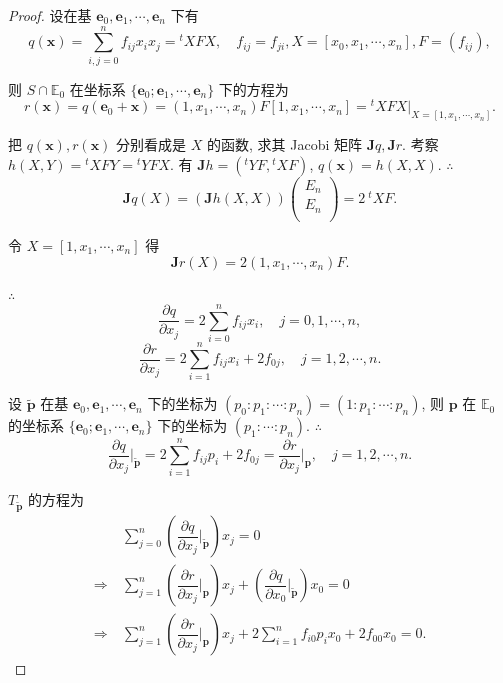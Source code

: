 \documentclass{ctexart}
\begin{document}
\begin{proof}
    设在基 $\boldsymbol{e}_0,\boldsymbol{e}_1,\cdots,\boldsymbol{e}_n$ 下有
    \[q(\boldsymbol{x})=\sum\limits_{i,j=0}^nf_{ij}x_ix_j={}^tXFX,\quad f_{ij}=f_{ji},X=[x_0,x_1,\cdots,x_n],F=(f_{ij}),\]

    则 $S\cap\mathbb{E}_0$ 在坐标系 $\{\boldsymbol{e}_0;\boldsymbol{e}_1,\cdots,\boldsymbol{e}_n\}$ 下的方程为
    \[r(\boldsymbol{x})=q(\boldsymbol{e}_0+\boldsymbol{x})=(1,x_1,\cdots,x_n)F[1,x_1,\cdots,x_n]={}^tXFX\Big|_{X=[1,x_1,\cdots,x_n]}.\]

    把 $q(\boldsymbol{x}),r(\boldsymbol{x})$ 分别看成是 $X$ 的函数, 求其 Jacobi 矩阵 $\boldsymbol{J}q,\boldsymbol{J}r$. 考察 $h(X,Y)={}^tXFY={}^tYFX$. 有 $\boldsymbol{J}h=({}^tYF,{}^tXF)$, $q(\boldsymbol{x})=h(X,X)$. $\therefore$
    \[\boldsymbol{J}q(X)=(\boldsymbol{J}h(X,X))\begin{pmatrix}
        E_n \\
        E_n \\
    \end{pmatrix}=2\ {}^tXF.\]

    令 $X=[1,x_1,\cdots,x_n]$ 得
    \[\boldsymbol{J}r(X)=2(1,x_1,\cdots,x_n)F.\]

    $\therefore$
    \[\dfrac{\partial q}{\partial x_j}=2\sum\limits_{i=0}^nf_{ij}x_i,\quad j=0,1,\cdots,n,\]
    \[\dfrac{\partial r}{\partial x_j}=2\sum\limits_{i=1}^nf_{ij}x_i+2f_{0j},\quad j=1,2,\cdots,n.\]

    设 $\tilde{\boldsymbol{p}}$ 在基 $\boldsymbol{e}_0,\boldsymbol{e}_1,\cdots,\boldsymbol{e}_n$ 下的坐标为 $(p_0:p_1:\cdots:p_n)=(1:p_1:\cdots:p_n)$, 则 $\boldsymbol{p}$ 在 $\mathbb{E}_0$ 的坐标系 $\{\boldsymbol{e}_0;\boldsymbol{e}_1,\cdots,\boldsymbol{e}_n\}$ 下的坐标为 $(p_1:\cdots:p_n)$. $\therefore$
    \[\dfrac{\partial q}{\partial x_j}\bigg|_{\tilde{\boldsymbol{p}}}=2\sum\limits_{i=1}^nf_{ij}p_i+2f_{0j}=\dfrac{\partial r}{\partial x_j}\bigg|_{\boldsymbol{p}},\quad j=1,2,\cdots,n.\]
    
    $T_{\tilde{\boldsymbol{p}}}$ 的方程为
    \begin{align*}
        & \sum\limits_{j=0}^n\left(\dfrac{\partial q}{\partial x_j}\bigg|_{\tilde{\boldsymbol{p}}}\right)x_j=0 \\
        \Rightarrow\ & \sum\limits_{j=1}^n\left(\dfrac{\partial r}{\partial x_j}\bigg|_{\boldsymbol{p}}\right)x_j+\left(\dfrac{\partial q}{\partial x_0}\bigg|_{\tilde{\boldsymbol{p}}}\right)x_0=0 \\
        \Rightarrow\ & \sum\limits_{j=1}^n\left(\dfrac{\partial r}{\partial x_j}\bigg|_{\boldsymbol{p}}\right)x_j+2\sum\limits_{i=1}^nf_{i0}p_ix_0+2f_{00}x_0=0.
    \end{align*}


\end{proof}
\end{document}
